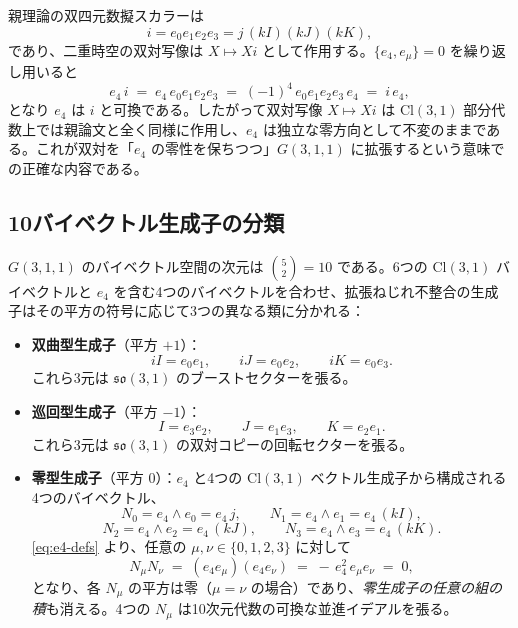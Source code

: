 \documentclass[11pt,a4paper]{article}
\begin{document}
親理論の双四元数擬スカラーは
\[
i = e_{0}e_{1}e_{2}e_{3} = j\,(kI)(kJ)(kK),
\]
であり、二重時空の双対写像は $X\mapsto Xi$ として作用する。$\{e_{4},e_{\mu}\}=0$ を繰り返し用いると
\[
e_{4}\,i \;=\; e_{4}\,e_{0}e_{1}e_{2}e_{3} \;=\; (-1)^{4}\,e_{0}e_{1}e_{2}e_{3}\,e_{4} \;=\; i\,e_{4},
\]
となり $e_{4}$ は $i$ と可換である。したがって双対写像 $X\mapsto Xi$ は $\mathrm{Cl}(3,1)$ 部分代数上では親論文と全く同様に作用し、$e_{4}$ は独立な零方向として不変のままである。これが双対を「$e_{4}$ の零性を保ちつつ」$G(3,1,1)$ に拡張するという意味での正確な内容である。

\subsection{10バイベクトル生成子の分類}

$G(3,1,1)$ のバイベクトル空間の次元は $\binom{5}{2}=10$ である。6つの $\mathrm{Cl}(3,1)$ バイベクトルと $e_{4}$ を含む4つのバイベクトルを合わせ、拡張ねじれ不整合の生成子はその平方の符号に応じて3つの異なる類に分かれる：

\begin{itemize}
  \item \textbf{双曲型生成子}（平方 $+1$）：
  \[
  iI = e_{0}e_{1},\qquad iJ = e_{0}e_{2},\qquad iK = e_{0}e_{3}.
  \]
  これら3元は $\mathfrak{so}(3,1)$ のブーストセクターを張る。

  \item \textbf{巡回型生成子}（平方 $-1$）：
  \[
  I = e_{3}e_{2},\qquad J = e_{1}e_{3},\qquad K = e_{2}e_{1}.
  \]
  これら3元は $\mathfrak{so}(3,1)$ の双対コピーの回転セクターを張る。

  \item \textbf{零型生成子}（平方 $0$）：$e_{4}$ と4つの $\mathrm{Cl}(3,1)$ ベクトル生成子から構成される4つのバイベクトル、
  \[
  N_{0} = e_{4}\wedge e_{0} = e_{4}\,j,\qquad
  N_{1} = e_{4}\wedge e_{1} = e_{4}\,(kI),
  \]
  \[
  N_{2} = e_{4}\wedge e_{2} = e_{4}\,(kJ),\qquad
  N_{3} = e_{4}\wedge e_{3} = e_{4}\,(kK).
  \]
  \eqref{eq:e4-defs} より、任意の $\mu,\nu\in\{0,1,2,3\}$ に対して
  \begin{equation}
  N_{\mu}N_{\nu} \;=\; (e_{4}e_{\mu})(e_{4}e_{\nu}) \;=\; -\,e_{4}^{2}\,e_{\mu}e_{\nu} \;=\; 0,
  \label{eq:null-strong-vanishing}
  \end{equation}
  となり、各 $N_{\mu}$ の平方は零（$\mu=\nu$ の場合）であり、\emph{零生成子の任意の組の積}も消える。4つの $N_{\mu}$ は10次元代数の可換な並進イデアルを張る。
\end{itemize}
\end{document}
